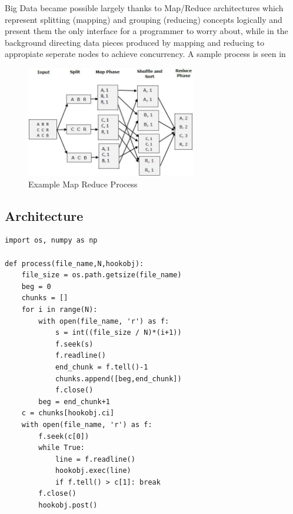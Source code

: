 \documentclass{article}
\begin{document}
Big Data became possible largely thanks to Map/Reduce architectures which
represent splitting (mapping) and grouping (reducing) concepts logically and
present them the only interface for a programmer to worry about, while in the
background directing data pieces produced by mapping and reducing to appropiate
seperate nodes to achieve concurrency. A sample process is seen in

\begin{figure}[h]
  \centering
  \includegraphics[width=20em]{mapreduce1.jpg}
  \caption{Example Map Reduce Process}
  \label{fig:mapreduce1}
\end{figure}

\subsection{Architecture}

\begin{verbatim}
import os, numpy as np

def process(file_name,N,hookobj):
    file_size = os.path.getsize(file_name)
    beg = 0
    chunks = []
    for i in range(N):
        with open(file_name, 'r') as f:
            s = int((file_size / N)*(i+1))
            f.seek(s)
            f.readline()
            end_chunk = f.tell()-1
            chunks.append([beg,end_chunk])
            f.close()
        beg = end_chunk+1
    c = chunks[hookobj.ci]
    with open(file_name, 'r') as f:
        f.seek(c[0])
        while True:
            line = f.readline()
            hookobj.exec(line)
            if f.tell() > c[1]: break
        f.close()
        hookobj.post()
\end{verbatim}



  
\end{document}
